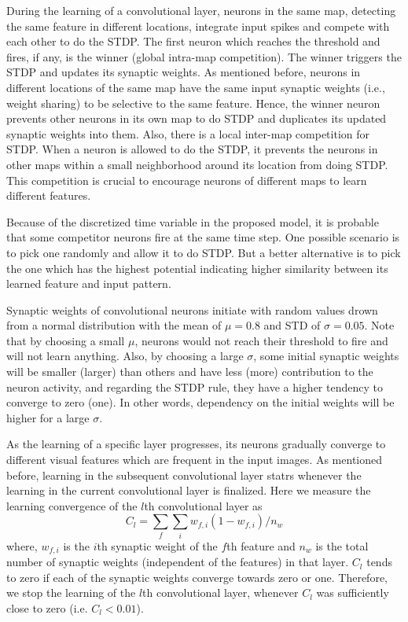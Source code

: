 \documentclass[preprint,5p,12pt,twocolumn]{article}
\begin{document}
During the learning of a convolutional layer, neurons in the same map, detecting the same feature in different locations, integrate input spikes and compete with each other to do the STDP. The first neuron which reaches the threshold and fires, if any, is the winner (global intra-map competition). The winner triggers the STDP and updates its synaptic weights. As mentioned before, neurons in different locations of the same map  have the same input synaptic weights (i.e., weight sharing) to be selective to the same feature. Hence, the winner neuron prevents other neurons in its own map to do STDP and duplicates its updated synaptic weights into them. Also, there is a local inter-map competition for STDP. When a neuron is allowed to do the STDP, it prevents the neurons in other maps within a small neighborhood around its location from doing STDP. This competition is crucial to encourage neurons of different maps to learn different features.

Because of the discretized time variable in the proposed model, it is probable that some competitor neurons fire at the same time step. One possible scenario is to pick one randomly and allow it to do STDP. But a better alternative is to pick the one which has the highest potential indicating higher similarity between its learned feature and input pattern.

Synaptic weights of convolutional neurons initiate with random values drown from a normal distribution with the mean of $\mu=0.8$ and STD of $\sigma=0.05$. Note that by choosing a small $ \mu $, neurons would not reach their threshold to fire and will not learn anything. Also, by  choosing a large $\sigma$, some initial synaptic weights will be smaller (larger) than others and have less (more) contribution to the neuron activity, and regarding the STDP rule, they have a higher tendency to converge to zero (one). In other words, dependency on the initial weights will be higher for a large $\sigma$.


 As the learning of a specific layer progresses, its neurons gradually converge to different visual features which are frequent in the input images. As mentioned before, learning in the subsequent convolutional layer statrs whenever the learning in the current convolutional layer is finalized. Here we measure the learning convergence of the $l$th convolutional layer as
\begin{equation}
C_l=\sum_{f}\sum_{i}{w_{f,i}(1-w_{f,i})}/n_w
\end{equation} 
where, $w_{f,i}$ is the $i$th synaptic weight of the $f$th feature and $n_w$ is the total number of synaptic weights (independent of the features) in that layer. $C_l$ tends to zero if each of the synaptic weights converge towards zero or one. Therefore, we stop the learning of the $l$th convolutional layer, whenever $C_l$ was sufficiently close to zero (i.e. $C_l< 0.01$).
\end{document}

